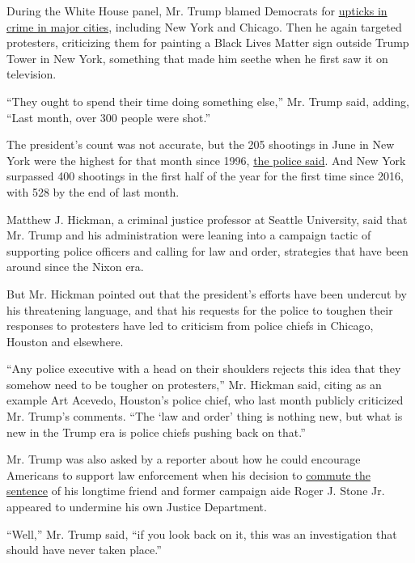 During the White House panel, Mr. Trump blamed Democrats for
\href{https://www.nytimes3xbfgragh.onion/2020/07/06/nyregion/murders-nyc-guns-crime.html}{upticks
in crime in major cities}, including New York and Chicago. Then he again
targeted protesters, criticizing them for painting a Black Lives Matter
sign outside Trump Tower in New York, something that made him seethe
when he first saw it on television.

``They ought to spend their time doing something else,'' Mr. Trump said,
adding, ``Last month, over 300 people were shot.''

The president's count was not accurate, but the 205 shootings in June in
New York were the highest for that month since 1996,
\href{https://www.nytimes3xbfgragh.onion/2020/07/06/nyregion/murders-nyc-guns-crime.html}{the
police said}. And New York surpassed 400 shootings in the first half of
the year for the first time since 2016, with 528 by the end of last
month.

Matthew J. Hickman, a criminal justice professor at Seattle University,
said that Mr. Trump and his administration were leaning into a campaign
tactic of supporting police officers and calling for law and order,
strategies that have been around since the Nixon era.

But Mr. Hickman pointed out that the president's efforts have been
undercut by his threatening language, and that his requests for the
police to toughen their responses to protesters have led to criticism
from police chiefs in Chicago, Houston and elsewhere.

``Any police executive with a head on their shoulders rejects this idea
that they somehow need to be tougher on protesters,'' Mr. Hickman said,
citing as an example Art Acevedo, Houston's police chief, who last month
publicly criticized Mr. Trump's comments. ``The `law and order' thing is
nothing new, but what is new in the Trump era is police chiefs pushing
back on that.''

Mr. Trump was also asked by a reporter about how he could encourage
Americans to support law enforcement when his decision to
\href{https://www.nytimes3xbfgragh.onion/2020/07/10/us/politics/trump-roger-stone-clemency.html}{commute
the sentence} of his longtime friend and former campaign aide Roger J.
Stone Jr. appeared to undermine his own Justice Department.

``Well,'' Mr. Trump said, ``if you look back on it, this was an
investigation that should have never taken place.''

